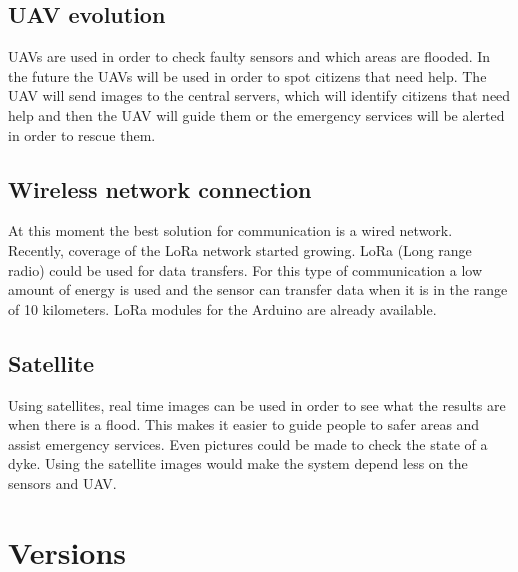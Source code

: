 \subsection{UAV evolution}
UAVs are used in order to check faulty sensors and which areas are flooded. In the future the UAVs will be used in order to spot citizens that need help. The UAV will send images to the central servers, which will identify citizens that need help and then the UAV will guide them or the emergency services will be alerted in order to rescue them. 

\subsection{Wireless network connection} 
At this moment the best solution for communication is a wired network. Recently, coverage of the LoRa network started growing. LoRa (Long range radio) could be used for data transfers. For this type of communication a low amount of energy is used and the sensor can transfer data when it is in the range of 10 kilometers.
LoRa modules for the Arduino are already available.

\subsection{Satellite}
Using satellites, real time images can be used in order to see what the results are when there is a flood. This makes it easier to guide people to safer areas and assist emergency services. Even pictures could be made to check the state of a dyke. Using the satellite images would make the system depend less on the sensors and UAV.

\section{Versions}




